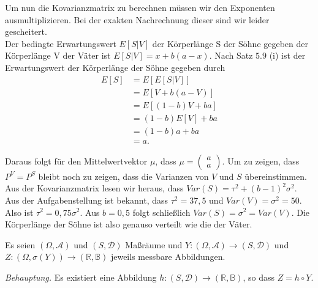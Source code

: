 \documentclass[10pt]{article}
\newcommand{\beh}{\textit{Behauptung. }}
\newenvironment{Aufgabe}[2][Aufgabe]{\begin{trivlist}
\item[\hskip \labelsep {\bfseries #1}\hskip \labelsep {\bfseries #2.}]}{\end{trivlist}}
\begin{document}
Um nun die Kovarianzmatrix zu berechnen müssen wir den Exponenten ausmultiplizieren.
Bei der exakten Nachrechnung dieser sind wir leider gescheitert.
\\

Der bedingte Erwartungswert $E[S|V]$ der Körperlänge S der Söhne gegeben der Körperlänge V der Väter ist 
$E[S|V] = x+b(a-x)$. Nach Satz $5.9$ (i) ist der Erwartungswert der Körperlänge der Söhne gegeben durch
\begin{align*}
	E[S] &= E[E[S|V]] 	   \\ 
		&= E[V + b(a-V)]   \\ 
		&= E[(1-b)V + ba]  \\ 
		&= (1-b)E[V] + ba  \\
		&= (1-b)a + ba 	   \\
		&= a.
\end{align*}   

Daraus folgt für den Mittelwertvektor $\mu$, dass $\mu = \begin{pmatrix} a \\ a\end{pmatrix}$. Um zu zeigen, dass
$P^{V} = P^{S}$ bleibt noch zu zeigen, dass die Varianzen von $V$ und $S$ übereinstimmen. Aus der Kovarianzmatrix 
lesen wir heraus, dass $Var(S) = \tau^2 + (b-1)^2\sigma^2$. Aus der Aufgabenstellung ist bekannt, dass $\tau^2 = 37,5$ 
und $Var(V) = \sigma^2 = 50$. Also ist $\tau^2 = 0,75\sigma^2$. Aus $b=0,5$ folgt schließlich $Var(S) = \sigma^2 = 
Var(V)$. Die Körperlänge der Söhne ist also genauso verteilt wie die der Väter.  

\begin{Aufgabe}{2} %
	Es seien $(\Omega, \mathcal{A})$ und $(S, \mathcal{D})$ Maßräume und $Y:(\Omega, \mathcal{A}) \rightarrow (S, \mathcal{D})$ und $Z:(\Omega, \sigma(Y)) \rightarrow (\mathbb{R}, \mathbb{B})$ jeweils messbare Abbildungen. 
\end{Aufgabe}

\beh Es existiert eine Abbildung $h:(S, \mathcal{D}) \rightarrow  (\mathbb{R}, \mathbb{B})$, so dass $Z = h \circ Y$.
\end{document}
